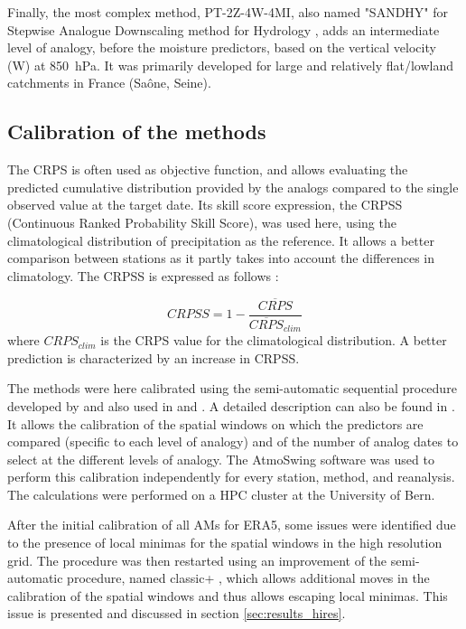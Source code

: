 \documentclass[alpha-refs]{wiley-article}
\begin{document}
Finally, the most complex method, PT-2Z-4W-4MI, also named "SANDHY" for Stepwise Analogue Downscaling method for Hydrology \citep{BenDaoud2016, Caillouet2016}, adds an intermediate level of analogy, before the moisture predictors, based on the vertical velocity (W) at 850~hPa. It was primarily developed for large and relatively flat/lowland catchments in France (Sa\^{o}ne, Seine).


\subsection{Calibration of the methods} %
\label{sec:calibration}

The CRPS \citep[Continuous Ranked Probability Score,][]{Brown1974, Matheson1976, Hersbach2000} is often used as objective function, and allows evaluating the predicted cumulative distribution provided by the analogs compared to the single observed value at the target date. Its skill score expression, the CRPSS (Continuous Ranked Probability Skill Score), was used here, using the climatological distribution of precipitation as the reference. It allows a better comparison between stations as it partly takes into account the differences in climatology. The CRPSS is expressed as follows \citep{Bradley2011}:

\begin{equation}
	\label{eq:CRPSS}
	CRPSS = 1-\frac{\overline{CRPS}}{\overline{CRPS}_{clim}}
\end{equation}
where $CRPS_{clim}$ is the CRPS value for the climatological distribution. A better prediction is characterized by an increase in CRPSS.

The methods were here calibrated using the semi-automatic sequential procedure developed by \citet{Bontron2004} and also used in \citet{Radanovics2013} and \citet{BenDaoud2016}. A detailed description can also be found in \citet{Horton2019}. It allows the calibration of the spatial windows on which the predictors are compared (specific to each level of analogy) and of the number of analog dates to select at the different levels of analogy. The AtmoSwing software \citep{Horton2019} was used to perform this calibration independently for every station, method, and reanalysis. The calculations were performed on a HPC cluster at the University of Bern. 

After the initial calibration of all AMs for ERA5, some issues were identified due to the presence of local minimas for the spatial windows in the high resolution grid. The procedure was then restarted using an improvement of the semi-automatic procedure, named classic+ \citep{Horton2019}, which allows additional moves in the calibration of the spatial windows and thus allows escaping local minimas. This issue is presented and discussed in section \ref{sec:results_hires}.
\end{document}
